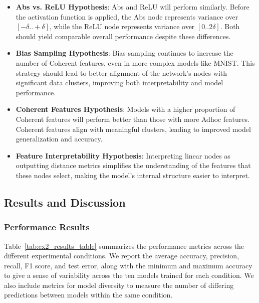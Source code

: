 \begin{itemize}
    \item \textbf{Abs vs. ReLU Hypothesis}: Abs and ReLU will perform similarly. Before the activation function is applied, the Abs node represents variance over \([- \delta .. + \delta]\), while the ReLU node represents variance over \([0 .. 2 \delta]\). Both should yield comparable overall performance despite these differences.
    
    \item \textbf{Bias Sampling Hypothesis}: Bias sampling continues to increase the number of Coherent features, even in more complex models like MNIST. This strategy should lead to better alignment of the network’s nodes with significant data clusters, improving both interpretability and model performance.
    
    \item \textbf{Coherent Features Hypothesis}: Models with a higher proportion of Coherent features will perform better than those with more Adhoc features. Coherent features align with meaningful clusters, leading to improved model generalization and accuracy.
    
    \item \textbf{Feature Interpretability Hypothesis}: Interpreting linear nodes as outputting distance metrics simplifies the understanding of the features that these nodes select, making the model’s internal structure easier to interpret.
\end{itemize}

\subsection{Results and Discussion}

\subsubsection{Performance Results}

Table~\ref{tab:ex2_results_table} summarizes the performance metrics across the different experimental conditions. We report the average accuracy, precision, recall, F1 score, and test error, along with the minimum and maximum accuracy to give a sense of variability across the ten models trained for each condition. We also include metrics for model diversity to measure the number of differing predictions between models within the same condition.

